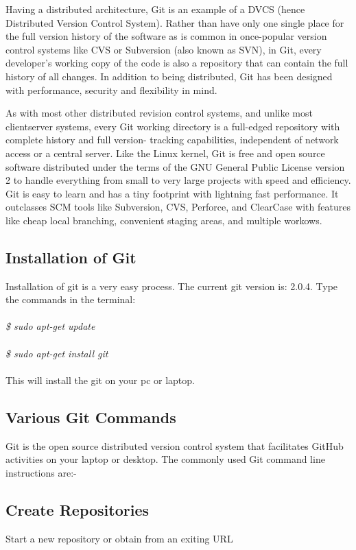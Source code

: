 Having a distributed architecture, Git is an example of a DVCS (hence Distributed Version Control System). Rather than have only one single place for the full version history of the software as is common in once-popular version control systems like CVS or Subversion (also known as SVN), in Git, every developer's working copy of the code is also a repository that can contain the full history of all changes. In addition to being distributed, Git has been designed with performance, security and flexibility in mind.

As with most other distributed revision control systems, and unlike most clientserver systems, every Git working directory is a full-edged repository with complete history and full version- tracking capabilities, independent of network access or a central server. Like the Linux kernel, Git is free and open source software distributed under the terms of the GNU General Public License version 2 to handle everything from small to very large projects with speed and efficiency.
Git is easy to learn and has a tiny footprint with lightning fast performance. It outclasses SCM tools like Subversion, CVS, Perforce, and ClearCase with features like cheap local branching, convenient staging areas, and multiple workows.

\subsection{Installation of Git}

Installation of git is a very easy process.
The current git version is: 2.0.4.
Type the commands in the terminal:\\\\
\emph{
\$ sudo apt-get update\\\\
\$ sudo apt-get install git\\\\}
This will install the git on your pc or laptop.

\subsection{Various Git Commands}

Git is the open source distributed version control system that facilitates GitHub activities on your laptop or desktop. The commonly used Git command line instructions are:-\\

\subsection*{Create Repositories}
Start a new repository or obtain from an exiting URL

